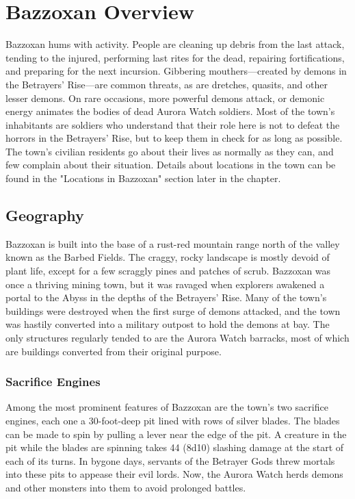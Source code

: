 \documentclass[10pt,a4,twoside,twocolumn,openany,nodeprecatedcode]{dndbook}
\begin{document}
\section{Bazzoxan Overview}
Bazzoxan hums with activity. People are cleaning up debris from the last attack, tending to the injured, performing last rites for the dead, repairing fortifications, and preparing for the next incursion. Gibbering mouthers—created by demons in the Betrayers' Rise—are common threats, as are dretches, quasits, and other lesser demons. On rare occasions, more powerful demons attack, or demonic energy animates the bodies of dead Aurora Watch soldiers.
Most of the town's inhabitants are soldiers who understand that their role here is not to defeat the horrors in the Betrayers' Rise, but to keep them in check for as long as possible. The town's civilian residents go about their lives as normally as they can, and few complain about their situation.
Details about locations in the town can be found in the "Locations in Bazzoxan" section later in the chapter.
\subsection{Geography}
Bazzoxan is built into the base of a rust-red mountain range north of the valley known as the Barbed Fields. The craggy, rocky landscape is mostly devoid of plant life, except for a few scraggly pines and patches of scrub.
Bazzoxan was once a thriving mining town, but it was ravaged when explorers awakened a portal to the Abyss in the depths of the Betrayers' Rise. Many of the town's buildings were destroyed when the first surge of demons attacked, and the town was hastily converted into a military outpost to hold the demons at bay. The only structures regularly tended to are the Aurora Watch barracks, most of which are buildings converted from their original purpose.
\subsubsection{Sacrifice Engines}
Among the most prominent features of Bazzoxan are the town's two sacrifice engines, each one a 30-foot-deep pit lined with rows of silver blades. The blades can be made to spin by pulling a lever near the edge of the pit. A creature in the pit while the blades are spinning takes 44 (8d10) slashing damage at the start of each of its turns.
In bygone days, servants of the Betrayer Gods threw mortals into these pits to appease their evil lords. Now, the Aurora Watch herds demons and other monsters into them to avoid prolonged battles.
\end{document}
